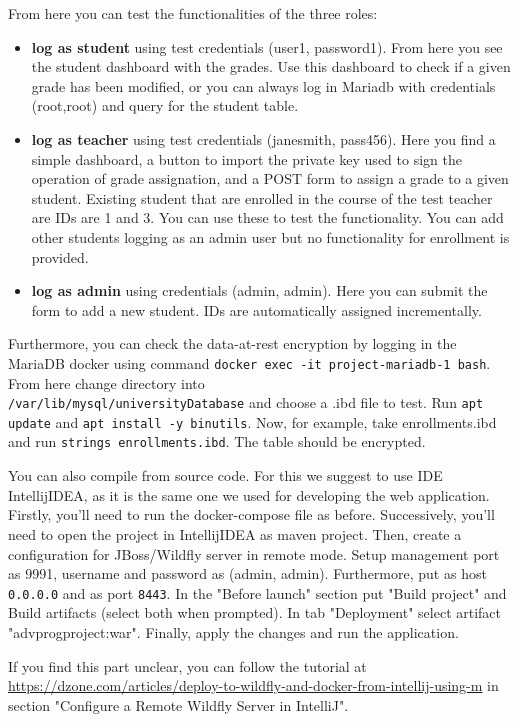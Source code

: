 From here you can test the functionalities of the three roles:

\begin{itemize}
    \item \textbf{log as student} using test credentials (user1, password1). From here you see the student dashboard with the grades. Use this dashboard to check if a given grade has been modified, or you can always log in Mariadb with credentials (root,root) and query for the student table.
    \item \textbf{log as teacher} using test credentials (jane\textunderscore smith, pass456). Here you find a simple dashboard, a button to import the private key used to sign the operation of grade assignation, and a POST form to assign a grade to a given student. Existing student that are enrolled in the course of the test teacher are IDs are 1 and 3. You can use these to test the functionality. You can add other students logging as an admin user but no functionality for enrollment is provided.
    \item \textbf{log as admin} using credentials (admin, admin). Here you can submit the form to add a new student. IDs are automatically assigned incrementally.
\end{itemize}

Furthermore, you can check the data-at-rest encryption by logging in the MariaDB docker using command \texttt{docker exec -it project-mariadb-1 bash}. From here change directory into \\\texttt{/var/lib/mysql/universityDatabase} and choose a .ibd file to test. Run \texttt{apt update} and \texttt{apt install -y binutils}. Now, for example, take enrollments.ibd and run \texttt{strings enrollments.ibd}. The table should be encrypted.

You can also compile from source code. For this we suggest to use IDE IntellijIDEA, as it is the same one we used for developing the web application. Firstly, you'll need to run the docker-compose file as before. Successively, you'll need to open the project in IntellijIDEA as maven project. Then, create a configuration for JBoss/Wildfly server in remote mode. Setup management port as 9991, username and password as (admin, admin). Furthermore, put as host \texttt{0.0.0.0} and as port \texttt{8443}. In the "Before launch" section put "Build project" and Build artifacts (select both when prompted). In tab "Deployment" select artifact "adv\textunderscore prog\textunderscore project:war". Finally, apply the changes and run the application. 

If you find this part unclear, you can follow the tutorial at \url{https://dzone.com/articles/deploy-to-wildfly-and-docker-from-intellij-using-m} in section "Configure a Remote Wildfly Server in IntelliJ".